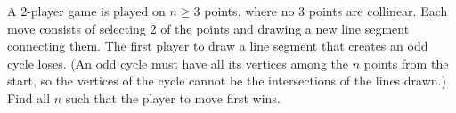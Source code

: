 A 2-player game is played on $n\geq 3$ points, where no 3 points are collinear. Each move consists of selecting 2 of the points and drawing a new line segment connecting them. The first player to draw a line segment that creates an odd cycle loses. (An odd cycle must have all its vertices among the $n$ points from the start, so the vertices of the cycle cannot be the intersections of the lines drawn.) Find all $n$ such that the player to move first wins.